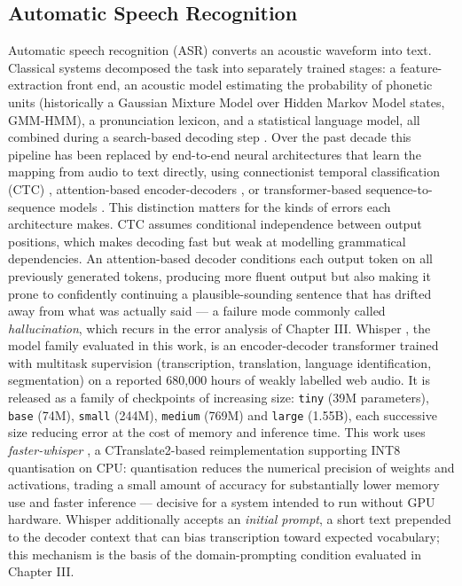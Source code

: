 \documentclass[12pt]{report}
\begin{document}
\subsection{Automatic Speech Recognition}
Automatic speech recognition (ASR) converts an acoustic waveform into text. Classical systems decomposed the task into separately trained stages: a feature-extraction front end, an acoustic model estimating the probability of phonetic units (historically a Gaussian Mixture Model over Hidden Markov Model states, GMM-HMM), a pronunciation lexicon, and a statistical language model, all combined during a search-based decoding step \cite{li2014overview}. Over the past decade this pipeline has been replaced by end-to-end neural architectures that learn the mapping from audio to text directly, using connectionist temporal classification (CTC) \cite{graves2012sequence}, attention-based encoder-decoders \cite{bahdanau2016end}, or transformer-based sequence-to-sequence models \cite{vaswani2017attention}.
This distinction matters for the kinds of errors each architecture makes. CTC assumes conditional independence between output positions, which makes decoding fast but weak at modelling grammatical dependencies. An attention-based decoder conditions each output token on all previously generated tokens, producing more fluent output but also making it prone to confidently continuing a plausible-sounding sentence that has drifted away from what was actually said --- a failure mode commonly called \textit{hallucination}, which recurs in the error analysis of Chapter III.
Whisper \cite{radford2023robust}, the model family evaluated in this work, is an encoder-decoder transformer trained with multitask supervision (transcription, translation, language identification, segmentation) on a reported 680{,}000 hours of weakly labelled web audio. It is released as a family of checkpoints of increasing size: \texttt{tiny} (39M parameters), \texttt{base} (74M), \texttt{small} (244M), \texttt{medium} (769M) and \texttt{large} (1.55B), each successive size reducing error at the cost of memory and inference time. This work uses \textit{faster-whisper} \cite{fasterwhisper2023}, a CTranslate2-based reimplementation supporting INT8 quantisation on CPU: quantisation reduces the numerical precision of weights and activations, trading a small amount of accuracy for substantially lower memory use and faster inference --- decisive for a system intended to run without GPU hardware. Whisper additionally accepts an \textit{initial prompt}, a short text prepended to the decoder context that can bias transcription toward expected vocabulary; this mechanism is the basis of the domain-prompting condition evaluated in Chapter III.
\end{document}
